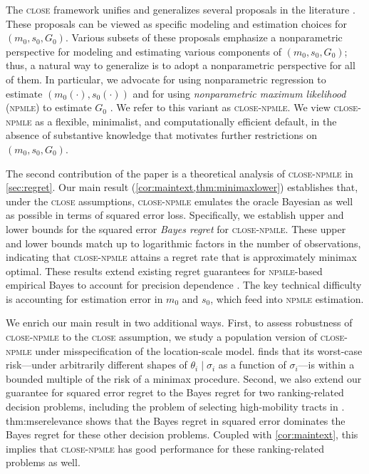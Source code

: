 \documentclass[12pt, reqno]{amsart}
\newcommand{\close}{\textsc{close}}
\newcommand{\npmle}{\textsc{npmle}}
\newcommand{\closenpmle}{\close-\npmle}
\numberwithin{equation}{section}
\begin{document}
 The \close{} framework unifies and generalizes several proposals in the literature \citep
 [among others,][]
 {kline2023discrimination,weinstein2018group,george2017mortality,ignatiadis2019covariate}.
 These proposals can be viewed as specific modeling and estimation choices for $ (m_0,
 s_0, G_0)$. Various subsets of these proposals emphasize a nonparametric perspective for
 modeling and estimating various components of $(m_0, s_0, G_0)$; thus, a natural way to
 generalize is to adopt a nonparametric perspective for all of them. In particular, we
 advocate for using nonparametric regression to estimate $(m_0(\cdot), s_0 (\cdot))$ and for
 using \emph{nonparametric maximum likelihood} (\npmle) to estimate $G_0$
 \citep{kiefer1956consistency,jiang2009general,koenker2014convex}. We refer to this
 variant as \closenpmle. We view \closenpmle{} as a flexible, minimalist, and
 computationally efficient default, in the absence of substantive knowledge that motivates
 further restrictions on $ (m_0, s_0, G_0)$.


The second contribution of the paper is a theoretical analysis of \closenpmle{} in
\cref{sec:regret}. Our main result (\cref{cor:maintext,thm:minimaxlower}) establishes
that, under the
\close{} assumptions, \closenpmle {}
emulates the oracle Bayesian as well as possible in terms of squared error loss. Specifically, we establish upper and lower bounds for the squared
error \emph{Bayes regret} for \closenpmle. These upper and lower bounds match up to
logarithmic factors in the number of observations, indicating that \closenpmle {} attains
a regret rate that is approximately minimax optimal. These results extend existing regret
guarantees for \npmle-based empirical Bayes to account for precision dependence \citep
{soloff2021multivariate,jiang2020general,jiang2009general,saha2020nonparametric}. The key
technical difficulty is accounting for estimation error in $m_0$ and $s_0$, which feed
into
\npmle{} estimation.

We enrich our main result in two additional ways. First, to assess robustness
of \closenpmle{} to the \close{} assumption, we study a population version of \closenpmle
{} under misspecification of the location-scale model.  finds
that its worst-case risk---under arbitrarily different shapes of $\theta_i
\mid \sigma_i$ as a function of $\sigma_i$---is within a bounded multiple of the risk of a
 minimax procedure. Second, we also extend our guarantee for squared error regret to the
 Bayes regret for two ranking-related decision problems, including the problem of
 selecting high-mobility tracts in \citet{bergman2019creating}. \Cref
 {thm:mserelevance} shows that the Bayes regret in squared error dominates the Bayes
 regret for these other decision problems. Coupled with
\cref{cor:maintext}, this implies that \closenpmle{} has good performance for these
 ranking-related problems as well.
\end{document}
